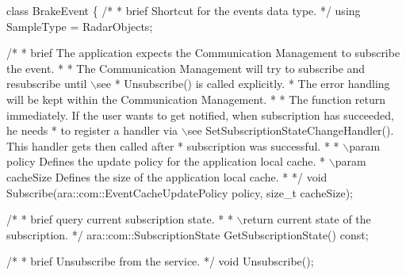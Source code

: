 \begin{DoxyCode}
\textcolor{keyword}{class }BrakeEvent \{
   \textcolor{comment}{/*}
\textcolor{comment}{   * brief Shortcut for the events data type.}
\textcolor{comment}{   */}
   \textcolor{keyword}{using} SampleType = RadarObjects;

   \textcolor{comment}{/*}
\textcolor{comment}{   * brief The application expects the Communication Management to}
\textcolor{comment}{     subscribe the event.}
\textcolor{comment}{   *}
\textcolor{comment}{   * The Communication Management will try to subscribe and resubscribe}
\textcolor{comment}{     until \(\backslash\)see}
\textcolor{comment}{   * Unsubscribe() is called explicitly.}
\textcolor{comment}{   * The error handling will be kept within the Communication Management.}
\textcolor{comment}{   *}
\textcolor{comment}{   * The function return immediately. If the user wants to get notified,}
\textcolor{comment}{     when subscription has succeeded, he needs}
\textcolor{comment}{   * to register a handler via \(\backslash\)see SetSubscriptionStateChangeHandler().}
\textcolor{comment}{     This handler gets then called after}
\textcolor{comment}{   * subscription was successful.}
\textcolor{comment}{   *}
\textcolor{comment}{   * \(\backslash\)param policy Defines the update policy for the application local cache.}
\textcolor{comment}{   * \(\backslash\)param cacheSize Defines the size of the application local cache.}
\textcolor{comment}{   *}
\textcolor{comment}{   */}
   \textcolor{keywordtype}{void} Subscribe(ara::com::EventCacheUpdatePolicy policy, \textcolor{keywordtype}{size\_t} cacheSize);

   \textcolor{comment}{/*}
\textcolor{comment}{   * brief query current subscription state.}
\textcolor{comment}{   *}
\textcolor{comment}{   * \(\backslash\)return current state of the subscription.}
\textcolor{comment}{   */}
   ara::com::SubscriptionState GetSubscriptionState() \textcolor{keyword}{const};

   \textcolor{comment}{/*}
\textcolor{comment}{   * brief Unsubscribe from the service.}
\textcolor{comment}{   */}
   \textcolor{keywordtype}{void} Unsubscribe();


\end{DoxyCode}
